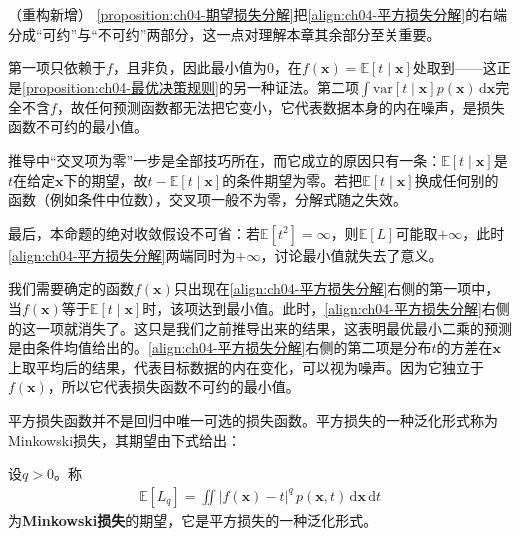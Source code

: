 \documentclass[../../main.tex]{subfiles}
\begin{document}
\begin{remark}（重构新增）
\cref{proposition:ch04-期望损失分解}把\eqref{align:ch04-平方损失分解}的右端分成“可约”与“不可约”两部分，这一点对理解本章其余部分至关重要。

第一项只依赖于$f$，且非负，因此最小值为$0$，在$f(\boldsymbol{x})=\mathbb{E}[t\mid\boldsymbol{x}]$处取到——这正是\cref{proposition:ch04-最优决策规则}的另一种证法。第二项$\int\mathrm{var}[t\mid\boldsymbol{x}]p(\boldsymbol{x})\,\mathrm{d}\boldsymbol{x}$完全不含$f$，故任何预测函数都无法把它变小，它代表数据本身的内在噪声，是损失函数不可约的最小值。

推导中“交叉项为零”一步是全部技巧所在，而它成立的原因只有一条：$\mathbb{E}[t\mid\boldsymbol{x}]$是$t$在给定$\boldsymbol{x}$下的期望，故$t-\mathbb{E}[t\mid\boldsymbol{x}]$的条件期望为零。若把$\mathbb{E}[t\mid\boldsymbol{x}]$换成任何别的函数（例如条件中位数），交叉项一般不为零，分解式随之失效。

最后，本命题的绝对收敛假设不可省：若$\mathbb{E}[t^2]=\infty$，则$\mathbb{E}[L]$可能取$+\infty$，此时\eqref{align:ch04-平方损失分解}两端同时为$+\infty$，讨论最小值就失去了意义。
\end{remark}

我们需要确定的函数$f(\boldsymbol{x})$只出现在\eqref{align:ch04-平方损失分解}右侧的第一项中，当$f(\boldsymbol{x})$等于$\mathbb{E}[t\mid\boldsymbol{x}]$时，该项达到最小值。此时，\eqref{align:ch04-平方损失分解}右侧的这一项就消失了。这只是我们之前推导出来的结果，这表明最优最小二乘的预测是由条件均值给出的。\eqref{align:ch04-平方损失分解}右侧的第二项是分布$t$的方差在$\boldsymbol{x}$上取平均后的结果，代表目标数据的内在变化，可以视为噪声。因为它独立于$f(\boldsymbol{x})$，所以它代表损失函数不可约的最小值。

平方损失函数并不是回归中唯一可选的损失函数。平方损失的一种泛化形式称为Minkowski损失，其期望由下式给出：

\begin{definition}[Minkowski损失]\label{definition:ch04-Minkowski损失}
设$q>0$。称
\begin{align}
  \mathbb{E}[L_q]=\iint|f(\boldsymbol{x})-t|^q\,p(\boldsymbol{x},t)\,\mathrm{d}\boldsymbol{x}\,\mathrm{d}t
  \label{align:ch04-Minkowski损失}
\end{align}
为\textbf{Minkowski损失}的期望，它是平方损失的一种泛化形式。
\end{definition}
\end{document}
